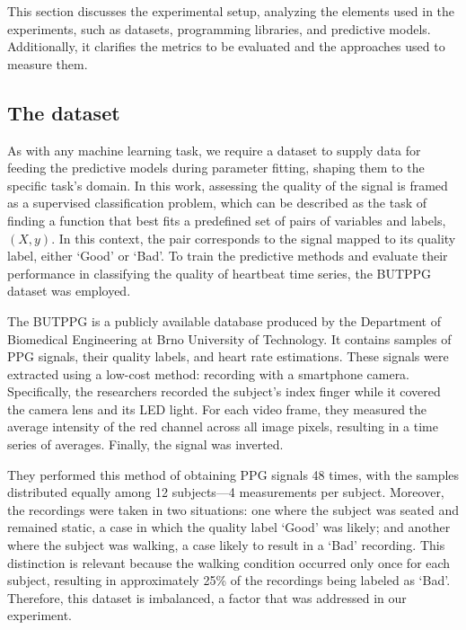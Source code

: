 This section discusses the experimental setup, analyzing the elements used in the experiments, such as datasets, programming libraries, and predictive models. Additionally, it clarifies the metrics to be evaluated and the approaches used to measure them.

\subsection{The dataset}

As with any machine learning task, we require a dataset to supply data for feeding the predictive models during parameter fitting, shaping them to the specific task's domain. In this work, assessing the quality of the signal is framed as a supervised classification problem, which can be described as the task of finding a function that best fits a predefined set of pairs of variables and labels, $(X, y)$. In this context, the pair corresponds to the signal mapped to its quality label, either `Good' or `Bad'. To train the predictive methods and evaluate their performance in classifying the quality of heartbeat time series, the \gls{BUTPPG}~\cite{butppg} dataset was employed.

%

The \gls{BUTPPG} is a publicly available database produced by the Department of Biomedical Engineering at Brno University of Technology. It contains samples of \gls{PPG} signals, their quality labels, and heart rate estimations. These signals were extracted using a low-cost method: recording with a smartphone camera. Specifically, the researchers recorded the subject's index finger while it covered the camera lens and its \gls{LED} light. For each video frame, they measured the average intensity of the red channel across all image pixels, resulting in a time series of averages. Finally, the signal was inverted. %

They performed this method of obtaining \gls{PPG} signals 48 times, with the samples distributed equally among 12 subjects—4 measurements per subject. Moreover, the recordings were taken in two situations: one where the subject was seated and remained static, a case in which the quality label `Good' was likely; and another where the subject was walking, a case likely to result in a `Bad' recording. This distinction is relevant because the walking condition occurred only once for each subject, resulting in approximately 25\% of the recordings being labeled as `Bad'. Therefore, this dataset is imbalanced, a factor that was addressed in our experiment.

